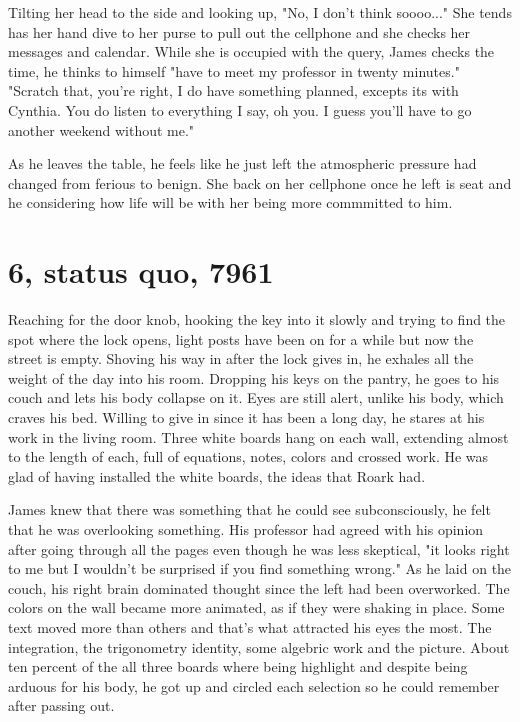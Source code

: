         Tilting her head to the side and looking up, "No, I don't think soooo..." She tends has her hand dive to her purse to pull out the 
    cellphone and she checks her messages and calendar. While she is occupied with the query, James checks the time, he thinks to himself
    "have to meet my professor in twenty minutes." "Scratch that, you're right, I do have something planned, excepts its with Cynthia. You do
    listen to everything I say, oh you. I guess you'll have to go another weekend without me."

        As he leaves the table, he feels like he just left the atmospheric pressure had changed from ferious to benign. She back on her cellphone
    once he left is seat and he considering how life will be with her being more commmitted to him.

\section{6, status quo, 7961}

        Reaching for the door knob, hooking the key into it slowly and trying to find the spot where the lock opens, light posts have been on
    for a while but now the street is empty. Shoving his way in after the lock gives in, he exhales all the weight of the day into his room. 
    Dropping his keys on the pantry, he goes to his couch and lets his body collapse on it. Eyes are still alert, unlike his body, which craves
    his bed. Willing to give in since it has been a long day, he stares at his work in the living room. Three white boards hang on each wall, 
    extending almost to the length of each, full of equations, notes, colors and crossed work. He was glad of having installed the white boards,
    the ideas that Roark had.

        James knew that there was something that he could see subconsciously, he felt that he was overlooking something. His professor had agreed
    with his opinion after going through all the pages even though he was less skeptical, "it looks right to me but I wouldn't be surprised if
    you find something wrong." As he laid on the couch, his right brain dominated thought since the left had been overworked. The colors on
    the wall became more animated, as if they were shaking in place. Some text moved more than others and that's what attracted his eyes the most.
    The integration, the trigonometry identity, some algebric work and the picture. About ten percent of the all three boards where being 
    highlight and despite being arduous for his body, he got up and circled each selection so he could remember after passing out.

